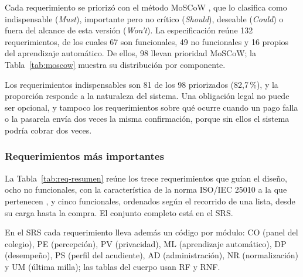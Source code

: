 Cada requerimiento se priorizó con el método MoSCoW \citep{clegg_case_1994}, que lo clasifica como indispensable
(\emph{Must}), importante pero no crítico (\emph{Should}), deseable (\emph{Could}) o fuera
del alcance de esta versión (\emph{Won't}). La especificación reúne 132 requerimientos, de los
cuales 67 son funcionales, 49 no funcionales y 16 propios del aprendizaje automático. De ellos, 98 llevan prioridad MoSCoW; la Tabla~\ref{tab:moscow} muestra su distribución por
componente.\par


Los requerimientos indispensables son 81 de los 98 priorizados (82,7\,\%), y la proporción responde a la naturaleza del
sistema. Una obligación legal no puede ser opcional, y tampoco los
requerimientos sobre qué ocurre cuando un pago falla o la pasarela envía dos veces la misma confirmación, porque sin ellos el sistema podría cobrar dos veces.\par

\subsubsection{Requerimientos más importantes}
\label{sec:req-importantes}

La Tabla~\ref{tab:req-resumen} reúne los trece requerimientos que guían el diseño, ocho no
funcionales, con la característica de la norma ISO/IEC 25010 a la que pertenecen
\citep{iso_25010_2011}, y cinco funcionales, ordenados según el recorrido de una lista, desde su carga
hasta la compra. El conjunto completo está en el SRS.

En el SRS cada requerimiento lleva además un código por módulo: CO (panel del colegio), PE (percepción), PV (privacidad), ML (aprendizaje automático), DP (desempeño), PS (perfil del acudiente), AD (administración), NR (normalización) y UM (última milla); las tablas del cuerpo usan RF y RNF.

